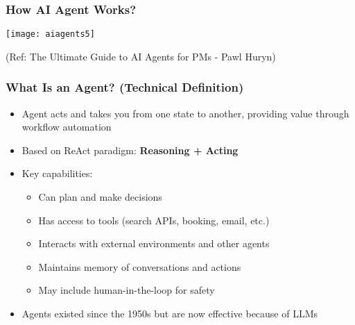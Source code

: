 \begin{frame}[fragile]\frametitle{How AI Agent Works?}

	\begin{center}
	\texttt{[image: aiagents5]}
	\end{center}
	
	{\tiny (Ref: The Ultimate Guide to AI Agents for PMs - Pawl Huryn)}
	
\end{frame}


\begin{frame}[fragile]\frametitle{What Is an Agent? (Technical Definition)}
\begin{itemize}
    \item Agent acts and takes you from one state to another, providing value through workflow automation
    \item Based on ReAct paradigm: \textbf{Reasoning + Acting}
    \item Key capabilities:
    \begin{itemize}
        \item Can plan and make decisions
        \item Has access to tools (search APIs, booking, email, etc.)
        \item Interacts with external environments and other agents
        \item Maintains memory of conversations and actions
        \item May include human-in-the-loop for safety
    \end{itemize}
    \item Agents existed since the 1950s but are now effective because of LLMs
\end{itemize}
\end{frame}


